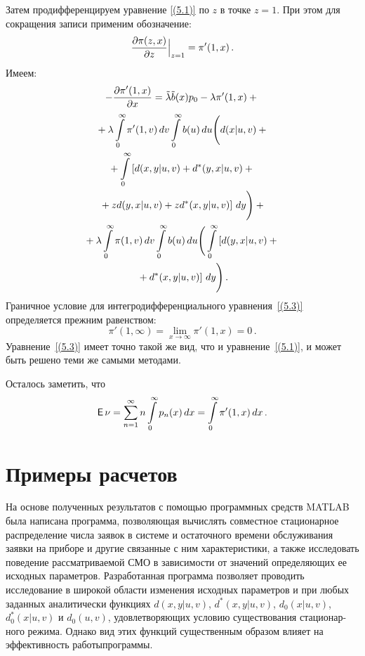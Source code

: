 \begin{multicols}{2}
Затем продифференцируем уравнение \eqref{(5.1)}
по $z$ в точке $z=1$.
При этом для сокращения записи применим
обозначение:
$$
\displaystyle\frac{\displaystyle \partial \pi(z,x) \mathstrut}{\displaystyle \partial z\mathstrut}\Big|_{z=1} =
\pi'(1,x) \,.
$$
Имеем:
\begin{multline}
-\displaystyle\frac{\displaystyle \partial \pi'(1,x)\mathstrut}{\displaystyle \partial x\mathstrut} = \tilde\lambda \tilde b(x) p_0 - \lambda \pi'(1,x)
+{}\\
{}+ \lambda \int\limits_0^\infty \pi'(1,v)\,dv
\int\limits_0^\infty b(u)\,du
\Bigg( d(x|u,v)
+ {}\\
{}+
\int\limits_0^\infty
\left[d(x,y|u,v) + d^*(y,x|u,v)
+{}\right.\\
\left.{}+ z d(y,x|u,v) + z d^*(x,y|u,v)\right] \,dy
\Bigg)
+ {}\\
{}+
\lambda \int\limits_0^\infty \pi(1,v)\,dv
\int\limits_0^\infty b(u)\,du
\Bigg( \int\limits_0^\infty
\left[d(y,x|u,v) +{}\right.\\
\left.{}+ d^*(x,y|u,v)\right]
\,dy \Bigg) \,.
\label{(5.3)}
\end{multline}
Граничное условие для интегродифференциального
уравнения~\eqref{(5.3)} определяется прежним равенством:
\begin{equation*}
\pi'(1,\infty) = \lim\limits_{x\to\infty} \pi'(1,x) = 0\,.
\end{equation*}
Уравнение~\eqref{(5.3)} имеет
точно такой же вид, что и уравнение~\eqref{(5.1)},
и может быть решено теми же самыми методами.

Осталось заметить, что
$$
{\sf E}\,\nu = \sum\limits_{n=1}^\infty n
\int\limits_0^\infty p_n(x)\, dx
= \int\limits_0^\infty \pi'(1,x)\, dx \,.
$$

\section{Примеры расчетов}

На основе полученных результатов с помощью
программных средств MATLAB была написана
программа, позволяющая вычислять совместное
стационарное распределение числа заявок в
системе и остаточного времени обслуживания
заявки на \mbox{приборе} и другие связанные с
ним характеристики, а также исследовать
поведение рассматриваемой СМО
в зависимости от значений определяющих ее
исходных параметров.
{Разработанная} программа позволяет
проводить исследование в широкой области
изменения исходных параметров
и при любых заданных аналитически функциях
$d(x,y|u,v)$, $d^*(x,y|u,v)$, $d_0(x|u,v)$,
$d_0^*(x|u,v)$ и $d_0(u,v)$,
удовле\-тво\-ря\-ющих условию существования стационар-\linebreak ного режима.
Однако вид этих функций существенным образом
влияет на эффективность работы\linebreak про\-граммы.


\end{multicols}
